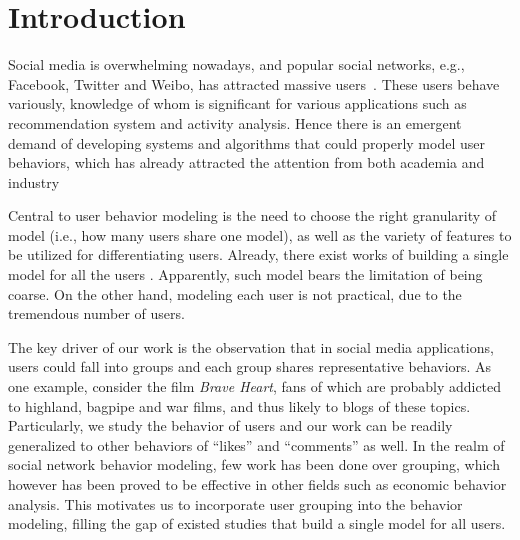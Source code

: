 \section{Introduction}
\label{sec:intro}

\par Social media is overwhelming nowadays, and popular social networks, e.g., Facebook, Twitter and Weibo, has attracted  massive users~\cite{DBLP:journals/fcsc/MaLHLH16,DBLP:journals/tkde/DuanMAMH17,DBLP:conf/icde/HuAMH16,IEEEexample:conf/wsdm/FengW13,IEEEexample:conf/ijcai/ZhangLTCL13}.
These users behave variously, knowledge of whom is significant for various applications such as recommendation system and activity analysis.
Hence there is an emergent demand of developing systems and algorithms that could properly model user behaviors, which has already attracted the attention from both academia and industry~\cite{IEEEexample:conf/wsdm/FengW13,IEEEexample:conf/ijcai/ZhangLTCL13,IEEEexample:conf/cikm/JiangLSW15,IEEEexample:conf/sigir/JiangLSLLMW16,IEEEexample:zhang2015retweet,IEEEexample:conf/pakdd/GiatsoglouCSFV15,IEEEexample:journals/corr/RanganathMHTL15}

Central to user behavior modeling is the need to choose the right granularity of model (i.e., how many users share one model), as well as the variety of features to be utilized for differentiating users.
Already, there exist works of building a single model for all the users \cite{IEEEexample:conf/wsdm/FengW13,IEEEexample:conf/ijcai/ZhangLTCL13}.
Apparently, such model bears the limitation of being coarse.
On the other hand, modeling each user is not practical, due to the tremendous number of users.

The key driver of our work is the observation that in social media applications, users could fall into groups and each group shares representative behaviors.
%
As one example, consider the film \textit{Brave Heart}, fans of which are probably addicted to highland, bagpipe and war films, and thus likely to \ret{} blogs of these topics.
Particularly, we study the \retg{} behavior of users and our work can be readily generalized to other behaviors of ``likes'' and ``comments'' as well.
In the realm of social network behavior modeling, few work has been done over grouping, which however has been proved to be effective in other fields such as economic behavior analysis.
This motivates us to incorporate user grouping into the \retg{} behavior modeling, filling the gap of existed studies that build a single model for all users.

